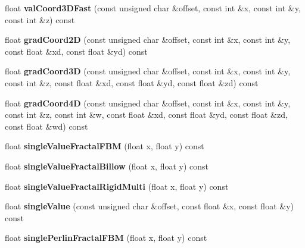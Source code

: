 \begin{DoxyCompactItemize}
\mbox{\label{classnoisefast_ac77370eb3465b39c578d7afc44f6df1f}} 
float {\bfseries val\+Coord3\+D\+Fast} (const unsigned char \&offset, const int \&x, const int \&y, const int \&z) const
\item 
\mbox{\label{classnoisefast_aefabe7f3659c8e80f1b1801c3ec561c2}} 
float {\bfseries grad\+Coord2D} (const unsigned char \&offset, const int \&x, const int \&y, const float \&xd, const float \&yd) const
\item 
\mbox{\label{classnoisefast_aaf7cb412c8cf7cf3b9f80158156ab997}} 
float {\bfseries grad\+Coord3D} (const unsigned char \&offset, const int \&x, const int \&y, const int \&z, const float \&xd, const float \&yd, const float \&zd) const
\item 
\mbox{\label{classnoisefast_aef713478b223fad6e59c130b9e9c5662}} 
float {\bfseries grad\+Coord4D} (const unsigned char \&offset, const int \&x, const int \&y, const int \&z, const int \&w, const float \&xd, const float \&yd, const float \&zd, const float \&wd) const
\item 
\mbox{\label{classnoisefast_aaccfc541095b571e410a5e5681785919}} 
float {\bfseries single\+Value\+Fractal\+F\+BM} (float x, float y) const
\item 
\mbox{\label{classnoisefast_a2e758e5f1593f43d113d81da7ba5d5f4}} 
float {\bfseries single\+Value\+Fractal\+Billow} (float x, float y) const
\item 
\mbox{\label{classnoisefast_ac2a117935d867d67f78d25d752032c46}} 
float {\bfseries single\+Value\+Fractal\+Rigid\+Multi} (float x, float y) const
\item 
\mbox{\label{classnoisefast_af3cf9ddc822a409f24b5bf9d53ae1e41}} 
float {\bfseries single\+Value} (const unsigned char \&offset, const float \&x, const float \&y) const
\item 
\mbox{\label{classnoisefast_a1d99eeac7f1cf83a427397594ce82846}} 
float {\bfseries single\+Perlin\+Fractal\+F\+BM} (float x, float y) const
\item 
\mbox{\label{classnoisefast_a4e3258e85b83f2859ce42b0c495c6c6b}} 

\end{DoxyCompactItemize}

